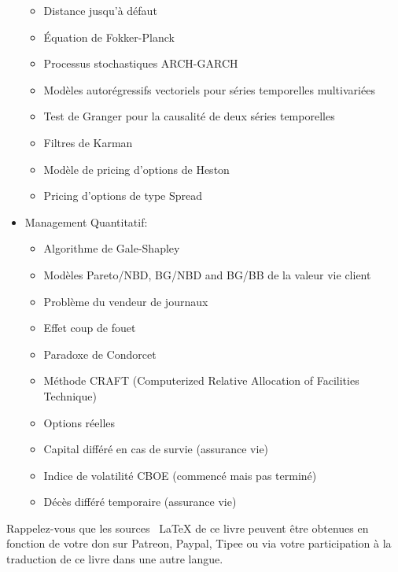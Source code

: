 \begin{itemize}
\begin{itemize}
				\item Distance jusqu'à défaut
				\item Équation de Fokker-Planck
				\item Processus stochastiques ARCH-GARCH
				\item Modèles autorégressifs vectoriels pour séries temporelles multivariées
				\item Test de Granger pour la causalité de deux séries temporelles
				\item Filtres de Karman
				\item Modèle de pricing d'options de Heston
				\item Pricing d'options de type Spread
			\end{itemize}	
		\item Management Quantitatif: 
			\begin{itemize}
				\item Algorithme de Gale-Shapley
				\item Modèles Pareto/NBD, BG/NBD and BG/BB de la valeur vie client
				\item Problème du vendeur de journaux
				\item Effet coup de fouet
				\item Paradoxe de Condorcet	
				\item Méthode CRAFT (Computerized Relative Allocation of Facilities Technique)
				\item Options réelles
				\item Capital différé en cas de survie (assurance vie)
				\item Indice de volatilité CBOE (commencé mais pas terminé)
				\item Décès différé temporaire (assurance vie)
			\end{itemize}
	\end{itemize}
	Rappelez-vous que les sources \ LaTeX {} de ce livre peuvent être obtenues en fonction de votre don sur Patreon, Paypal, Tipee ou via votre participation à la traduction de ce livre dans une autre langue.
	
